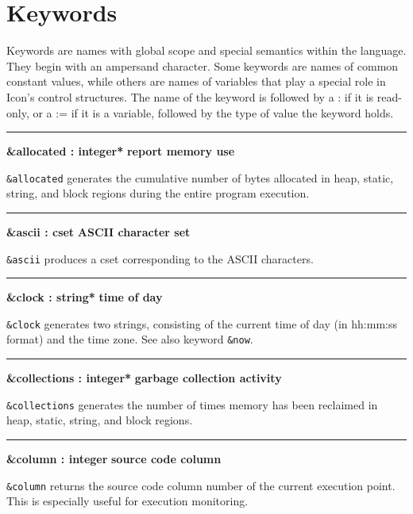 \section{Keywords}

Keywords are names with global scope and special semantics within
the language. They begin with an ampersand character. Some keywords are names of
common constant values, while others are names of variables that play a special
role in Icon's control structures. The
name of the keyword is followed by a : if it is read-only, or a := if it is a
variable, followed by the type of value the keyword holds.

\bigskip\hrule\vspace{0.1cm}
\noindent
{\bf \&allocated : integer* } \hfill {\bf report memory use}

\noindent
{}\texttt{\&allocated} generates the cumulative number
of bytes allocated in heap, static, string, and block regions during
the entire program execution.

\bigskip\hrule\vspace{0.1cm}
\noindent
{\bf \&ascii : cset } \hfill {\bf ASCII character set}

\noindent
{}\texttt{\&ascii} produces a cset corresponding to
the ASCII characters.

\bigskip\hrule\vspace{0.1cm}
\noindent
{\bf \&clock : string* } \hfill {\bf time of day}

\noindent
\texttt{\&clock} generates two strings, consisting of the current
time of day (in hh:mm:ss format) and the time zone.
See also keyword \texttt{\&now}.

\bigskip\hrule\vspace{0.1cm}
\noindent
{\bf \&collections : integer* } \hfill {\bf garbage collection activity}

\noindent
{}\texttt{\&collections} generates the number of
times memory has been reclaimed in heap, static, string, and block
regions.

\bigskip\hrule\vspace{0.1cm}
\noindent
{\bf \&column : integer } \hfill {\bf source code column}

\noindent
\texttt{\&column} returns the source code
column number of the current execution point. This
is especially useful for execution monitoring.

